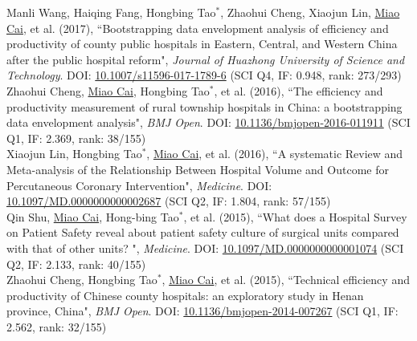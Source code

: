 \documentclass[11pt, a4paper]{article}
\newcommand{\years}[1]{\marginnote{\scriptsize #1}}
\begin{document}
\years{2017}Manli Wang, Haiqing Fang, Hongbing Tao$^\ast$, Zhaohui Cheng, Xiaojun Lin, \underline{Miao Cai}, et al. (2017), ``Bootstrapping data envelopment analysis of efficiency and productivity of county public hospitals in Eastern, Central, and Western China after the public hospital reform", \emph{Journal of Huazhong University of Science and Technology}. DOI: \href{https://doi.org/10.1007/s11596-017-1789-6}{10.1007/s11596-017-1789-6} (SCI Q4, IF: 0.948, rank: 273/293)\\
\years{2016}Zhaohui Cheng, \underline{Miao Cai}, Hongbing Tao$^\ast$, et al. (2016), ``The efficiency and productivity measurement of rural township hospitals in China: a bootstrapping data envelopment analysis", \emph{BMJ Open}. DOI: \href{https://doi.org/10.1136/bmjopen-2016-011911}{10.1136/bmjopen-2016-011911} (SCI Q1, IF: 2.369, rank: 38/155)\\
\years{2016}Xiaojun Lin, Hongbing Tao$^\ast$, \underline{Miao Cai}, et al. (2016), ``A systematic Review and Meta-analysis of the Relationship Between Hospital Volume and Outcome for Percutaneous Coronary Intervention", \emph{Medicine}. DOI: \href{https://doi.org/10.1097/MD.0000000000002687}{10.1097/MD.0000000000002687} (SCI Q2, IF: 1.804, rank: 57/155)\\
\years{2015}Qin Shu, \underline{Miao Cai}, Hong-bing Tao$^\ast$, et al. (2015), ``What does a Hospital Survey on Patient Safety reveal about patient safety culture of surgical units compared with that of other units? ", \emph{Medicine}. DOI: \href{https://doi.org/10.1097/MD.0000000000001074}{10.1097/MD.0000000000001074} (SCI Q2, IF: 2.133, rank: 40/155)\\
\years{2015}Zhaohui Cheng, Hongbing Tao$^\ast$, \underline{Miao Cai}, et al. (2015), ``Technical efficiency and productivity of Chinese county hospitals: an exploratory study in Henan province, China", \emph{BMJ Open}. DOI: \href{https://doi.org/10.1136/bmjopen-2014-007267}{10.1136/bmjopen-2014-007267} (SCI Q1, IF: 2.562, rank: 32/155)
\end{document}
